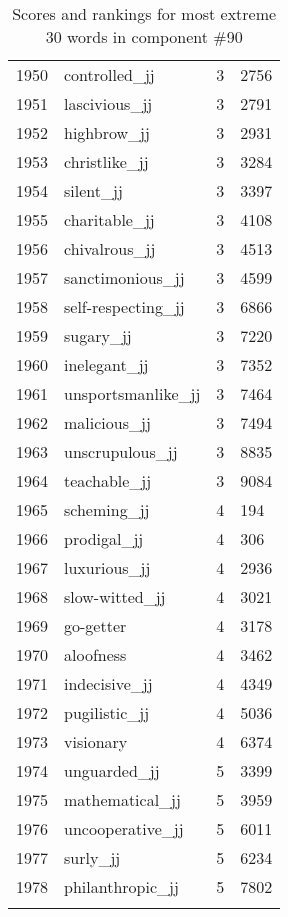 \begin{longtable}[!htbp]{| rlr@{.}l |}
    1950 & controlled\_jj & 3 & 2756 \\
    1951 & lascivious\_jj & 3 & 2791 \\
    1952 & highbrow\_jj & 3 & 2931 \\
    1953 & christlike\_jj & 3 & 3284 \\
    1954 & silent\_jj & 3 & 3397 \\
    1955 & charitable\_jj & 3 & 4108 \\
    1956 & chivalrous\_jj & 3 & 4513 \\
    1957 & sanctimonious\_jj & 3 & 4599 \\
    1958 & self-respecting\_jj & 3 & 6866 \\
    1959 & sugary\_jj & 3 & 7220 \\
    1960 & inelegant\_jj & 3 & 7352 \\
    1961 & unsportsmanlike\_jj & 3 & 7464 \\
    1962 & malicious\_jj & 3 & 7494 \\
    1963 & unscrupulous\_jj & 3 & 8835 \\
    1964 & teachable\_jj & 3 & 9084 \\
    1965 & scheming\_jj & 4 & 194 \\
    1966 & prodigal\_jj & 4 & 306 \\
    1967 & luxurious\_jj & 4 & 2936 \\
    1968 & slow-witted\_jj & 4 & 3021 \\
    1969 & go-getter & 4 & 3178 \\
    1970 & aloofness & 4 & 3462 \\
    1971 & indecisive\_jj & 4 & 4349 \\
    1972 & pugilistic\_jj & 4 & 5036 \\
    1973 & visionary & 4 & 6374 \\
    1974 & unguarded\_jj & 5 & 3399 \\
    1975 & mathematical\_jj & 5 & 3959 \\
    1976 & uncooperative\_jj & 5 & 6011 \\
    1977 & surly\_jj & 5 & 6234 \\
    1978 & philanthropic\_jj & 5 & 7802 \\
    \hline
    \caption{Scores and rankings for most extreme 30 words in component \#90} \\
\end{longtable}
